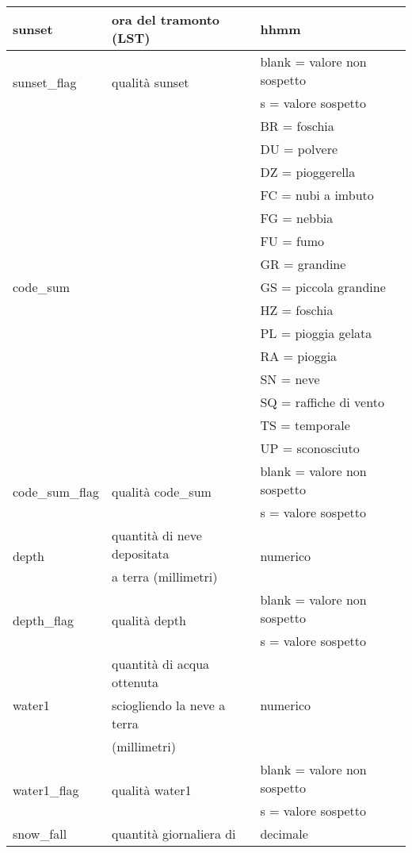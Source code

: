 \begin{longtable}{lll}
	\hline	
	sunset				& ora del tramonto (LST) & hhmm		   	\\ 
	\hline
	\multirow{2}{*}{sunset\_flag}		& \multirow{2}{*}{qualità sunset} &  blank = valore non sospetto \\
	& & s = valore sospetto			 \\ 
	\hline	
	\multirow{15}{*}{code\_sum}			& \multirow{15}{*}{ }	 & 	 BR = foschia \\
	& & DU = polvere\\
	& & DZ = pioggerella \\
	& & FC = nubi a imbuto \\
	& & FG = nebbia \\
	& & FU = fumo \\
	& lista di condizioni & GR = grandine \\
	& meteorologiche giornaliere & GS = piccola grandine\\
	& & HZ = foschia \\
	& & PL = pioggia gelata\\
	& & RA = pioggia \\
	& & SN = neve \\
	& & SQ = raffiche di vento\\
	& & TS = temporale \\
	& & UP = sconosciuto \\	\hline	   	
	\multirow{2}{*}{code\_sum\_flag}		& \multirow{2}{*}{qualità code\_sum} &  blank = valore non sospetto \\
	& & s = valore sospetto			 \\ 
	\hline	
	\multirow{2}{*}{depth}	& quantità di neve depositata  	 & \multirow{2}{*}{numerico}		 	\\ 
	& a terra (millimetri) & \\
	\hline
	\multirow{2}{*}{depth\_flag}		& \multirow{2}{*}{qualità depth} &  blank = valore non sospetto \\
	& & s = valore sospetto			 \\ 
	\hline
	\multirow{3}{*}{water1}	& quantità di acqua ottenuta  	 & \multirow{3}{*}{numerico}		 	\\ 
	& sciogliendo la neve a terra  & \\
	&  (millimetri) & \\
	\hline
	\multirow{2}{*}{water1\_flag}		& \multirow{2}{*}{qualità water1} &  blank = valore non sospetto \\
	& & s = valore sospetto			 \\ 
	\hline	
	\multirow{2}{*}{snow\_fall}			& quantità giornaliera di 	 & \multirow{2}{*}{decimale}				\\ 

\end{longtable}
